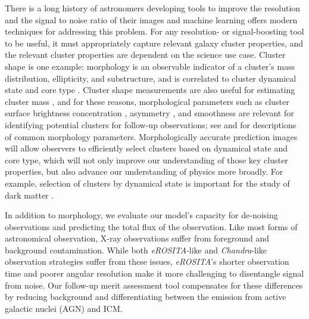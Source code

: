 \documentclass[twocolumn, 11pt]{aastex63}%
\begin{document}
There is a long history of astronomers developing tools to improve the resolution and the signal to noise ratio of their images \citep[e.g.,][]{Richardson_1972,Lucy_1974,Cornwell_1985} and machine learning offers modern techniques for addressing this problem. For any resolution- or signal-boosting tool to be useful, it must appropriately capture relevant galaxy cluster properties, and the relevant cluster properties are dependent on the science use case.  Cluster shape is one example: morphology is an observable indicator of a cluster's mass distribution, ellipticity, and substructure, and is correlated to cluster dynamical state \citep{ Melott_2001, Rasia_2013, Parekh_2015, Lovisari_2017, Chen_2019, Lau_2021} and core type \citep{Santos_2008}.  Cluster shape measurements are also useful for estimating cluster mass \citep{Green_2019}, and for these reasons, morphological parameters such as cluster surface brightness concentration \citep{Santos_2008}, asymmetry \citep{Lotz_2004}, and smoothness \citep{Lotz_2004} are  relevant for identifying potential clusters for follow-up observations; see \citet{Rasia_2013} and \citet{Ghirardini_2022} for descriptions of common morphology parameters. Morphologically accurate prediction images will allow observers to efficiently select clusters based on dynamical state and core type, which will not only improve our understanding of those key cluster properties, but also advance our understanding of physics more broadly. For example, selection of clusters by dynamical state is important for the study of dark matter \citep[e.g.,][]{Eckert_2022}.

In addition to morphology, we evaluate our model's capacity for de-noising observations and predicting the total flux of the observation. Like most forms of astronomical observation, X-ray observations suffer from foreground and background contamination. While both \textit{eROSITA}-like and \textit{Chandra}-like observation strategies suffer from these issues, \textit{eROSITA}'s shorter observation time and poorer angular resolution make it more challenging to disentangle signal from noise. Our follow-up merit assessment tool compensates for these differences by reducing background and differentiating between the emission from active galactic nuclei (AGN) and ICM.
\end{document}
